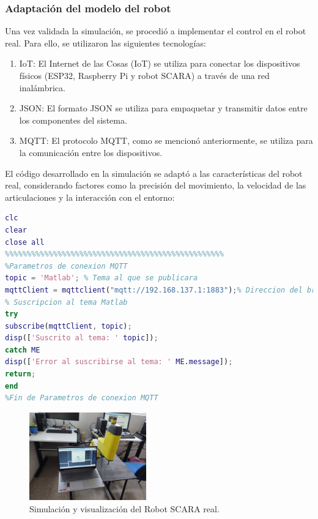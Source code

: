 \documentclass[final]{foresj}
\begin{document}
\subsubsection{Adaptación del modelo del robot}
Una vez validada la simulación, se procedió a implementar el control en el robot real. Para ello, se utilizaron las siguientes tecnologías:

\begin{enumerate}
\item IoT: El Internet de las Cosas (IoT) se utiliza para conectar los dispositivos físicos (ESP32, Raspberry Pi y robot SCARA) a través de una red inalámbrica.
\item JSON: El formato JSON se utiliza para empaquetar y transmitir datos entre los componentes del sistema.
\item MQTT: El protocolo MQTT, como se mencionó anteriormente, se utiliza para la comunicación entre los dispositivos.
\end{enumerate}

El código desarrollado en la simulación se adaptó a las características del robot real, considerando factores como la precisión del movimiento, la velocidad de las articulaciones y la interacción con el entorno:

\begin{lstlisting}[language=Matlab]
clc
clear
close all
%%%%%%%%%%%%%%%%%%%%%%%%%%%%%%%%%%%%%%%%%%%%%%%%%%
%Parametros de conexion MQTT
topic = 'Matlab'; % Tema al que se publicara
mqttClient = mqttclient("mqtt://192.168.137.1:1883");% Direccion del broker MQTT
% Suscripcion al tema Matlab
try
subscribe(mqttClient, topic);
disp(['Suscrito al tema: ' topic]);
catch ME
disp(['Error al suscribirse al tema: ' ME.message]);
return;
end
%Fin de Parametros de conexion MQTT
\end{lstlisting}

\begin{figure}[h!]
\centering
\includegraphics[width=0.45\textwidth]{SCARA4.jpg}
\caption{Simulación y visualización del Robot SCARA real.}
\label{fig:my_label}
\end{figure}
\end{document}
